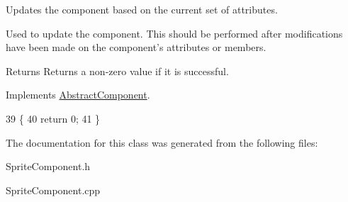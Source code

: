 Updates the component based on the current set of attributes. 

Used to update the component. This should be performed after modifications have been made on the component's attributes or members.

\begin{DoxyReturn}{Returns}
Returns a non-\/zero value if it is successful. 
\end{DoxyReturn}


Implements \hyperlink{class_abstract_component_a35c9cab4e3845a947609b6ada8dc89cf}{Abstract\-Component}.


\begin{DoxyCode}
39                             \{
40     \textcolor{keywordflow}{return} 0;
41 \}\end{DoxyCode}


The documentation for this class was generated from the following files\-:\begin{DoxyCompactItemize}
\item 
Sprite\-Component.\-h\item 
Sprite\-Component.\-cpp\end{DoxyCompactItemize}
